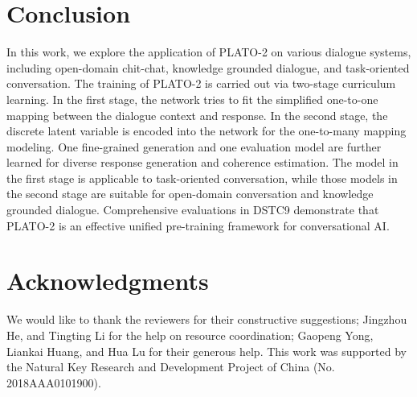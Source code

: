 \documentclass[letterpaper]{article} \usepackage{aaai21}  \usepackage{times}  \usepackage{helvet} \usepackage{courier}  \usepackage[hyphens]{url}  \usepackage{graphicx} \urlstyle{rm} \def\UrlFont{\rm}  \usepackage{natbib}  \usepackage{caption} \frenchspacing  \setlength{\pdfpagewidth}{8.5in}  \setlength{\pdfpageheight}{11in}  \usepackage{amsmath}
\begin{document}
\section{Conclusion}
In this work, we explore the application of PLATO-2 on various dialogue systems, including open-domain chit-chat, knowledge grounded dialogue, and task-oriented conversation. The training of PLATO-2 is carried out via two-stage curriculum learning. In the first stage, the network tries to fit the simplified one-to-one mapping between the dialogue context and response. In the second stage, the discrete latent variable is encoded into the network for the one-to-many mapping modeling. One fine-grained generation and one evaluation model are further learned for diverse response generation and coherence estimation. The model in the first stage is applicable to task-oriented conversation, while those models in the second stage are suitable for open-domain conversation and knowledge grounded dialogue. Comprehensive evaluations in DSTC9 demonstrate that PLATO-2 is an effective unified pre-training framework for conversational AI.

\section*{Acknowledgments}
We would like to thank the reviewers for their constructive suggestions; Jingzhou He, and Tingting Li for the help on resource coordination; Gaopeng Yong, Liankai Huang, and Hua Lu for their generous help. This work was supported by the Natural Key Research and Development Project of China (No. 2018AAA0101900).


\end{document}
